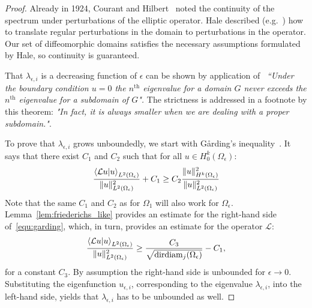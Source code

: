 \begin{proof}
  Already in 1924, Courant and Hilbert~\cite[vol I. chapter V. paragraph 13]{courant_methods_2008} noted the continuity of the spectrum under perturbations of the elliptic operator. Hale described (e.g.~\cite{hale_eigenvalues_2005}) how to translate regular perturbations in the domain to perturbations in the operator. Our set of diffeomorphic domains satisfies the necessary assumptions formulated by Hale, so continuity is guaranteed.

  That $\lambda_{\epsilon, i}$ is a decreasing function of $\epsilon$ can be shown by application of~\cite[vol I, chapter  VI, paragraph 2, theorem 3]{courant_methods_2008} \emph{``Under the boundary condition $u = 0$ the $n^\text{th}$ eigenvalue for a domain $G$ never exceeds the $n^\text{th}$ eigenvalue for a subdomain of $G$".} The strictness is addressed in a footnote by this theorem: \emph{"In fact, it is always smaller when we are dealing with a proper subdomain."}.

  To prove that $\lambda_{\epsilon, i}$ grows unboundedly, we start with Gårding's inequality~\cite[section 9.2.3]{renardy_introduction_2004}. It says that there exist $C_1$ and $C_2$ such that for all $u \in H^k_0(\Omega_\epsilon)$:
  \begin{equation}\label{equ:garding}
    \frac{\bra{\mathcal{L}u}\ket{u}_{L^2(\Omega_\epsilon)}}{\|u\|_{L^2(\Omega_\epsilon)}^2} + C_1 \geq C_2 \frac{\|u\|_{H^k(\Omega_\epsilon)}^2}{\|u\|_{L^2(\Omega_\epsilon)}^2}
  \end{equation}
  Note that the same $C_1$ and $C_2$ as for $\Omega_1$ will also work for $\Omega_\epsilon$. Lemma~\ref{lem:friederichs_like} provides an estimate for the right-hand side of~\eqref{equ:garding}, which, in turn, provides an estimate for the operator $\mathcal{L}$:
  $$
    \frac{\bra{\mathcal{L}u}\ket{u}_{L^2(\Omega_\epsilon)}}{\|u\|_{L^2(\Omega_\epsilon)}^2} \geq \frac{C_3}{\sqrt{\operatorname{dirdiam}_j(\Omega_\epsilon)}} - C_1\text{,}
  $$
  for a constant $C_3$. By assumption the right-hand side is unbounded for $\epsilon \to 0$. Substituting the eigenfunction $u_{\epsilon, i}$, corresponding to the eigenvalue $\lambda_{\epsilon, i}$, into the left-hand side, yields that $\lambda_{\epsilon, i}$ has to be unbounded as well.
\end{proof}

